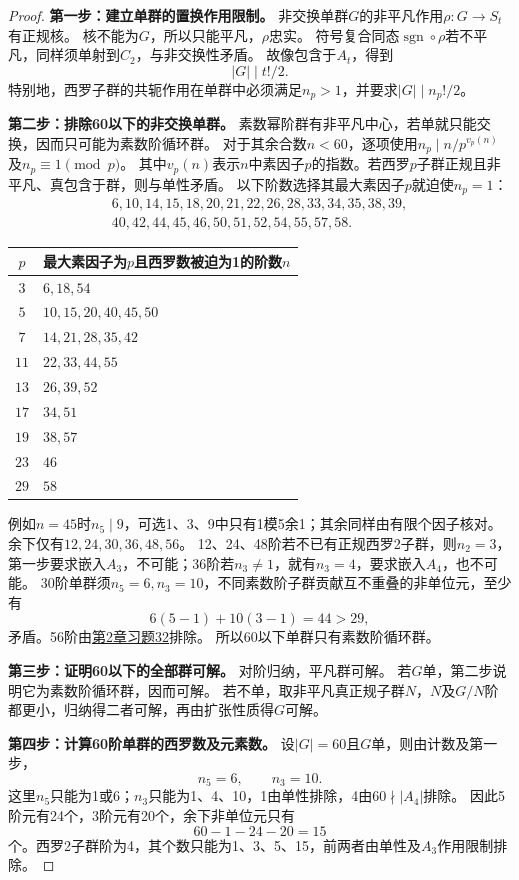 \documentclass[UTF8,a4paper,11pt,fontset=windows]{ctexart}
\newcommand{\exref}[2]{\hyperref[ex:#1:#2]{第#1章习题#2}}
\begin{document}
\begin{proof}
\textbf{第一步：建立单群的置换作用限制。}
非交换单群$G$的非平凡作用$\rho:G\to S_t$有正规核。
核不能为$G$，所以只能平凡，$\rho$忠实。
符号复合同态$\operatorname{sgn}\circ\rho$若不平凡，同样须单射到$C_2$，与非交换性矛盾。
故像包含于$A_t$，得到
\[
|G|\mid t!/2.
\]
特别地，西罗子群的共轭作用在单群中必须满足$n_p>1$，并要求$|G|\mid n_p!/2$。

\textbf{第二步：排除60以下的非交换单群。}
素数幂阶群有非平凡中心，若单就只能交换，因而只可能为素数阶循环群。
对于其余合数$n<60$，逐项使用$n_p\mid n/p^{v_p(n)}$及$n_p\equiv1\pmod p$。
其中$v_p(n)$表示$n$中素因子$p$的指数。若西罗$p$子群正规且非平凡、真包含于群，则与单性矛盾。
以下阶数选择其最大素因子$p$就迫使$n_p=1$：
\[
\begin{gathered}
6,10,14,15,18,20,21,22,26,28,33,34,35,38,39,\\
40,42,44,45,46,50,51,52,54,55,57,58.
\end{gathered}
\]

\begin{center}\begin{tabular}{c|p{11cm}}
$p$ & 最大素因子为$p$且西罗数被迫为1的阶数$n$\\\hline
$3$ & $6,18,54$\\
$5$ & $10,15,20,40,45,50$\\
$7$ & $14,21,28,35,42$\\
$11$ & $22,33,44,55$\\
$13$ & $26,39,52$\\
$17$ & $34,51$\\
$19$ & $38,57$\\
$23$ & $46$\\
$29$ & $58$\\
\end{tabular}\end{center}
例如$n=45$时$n_5\mid9$，可选1、3、9中只有1模5余1；其余同样由有限个因子核对。
余下仅有$12,24,30,36,48,56$。
12、24、48阶若不已有正规西罗2子群，则$n_2=3$，第一步要求嵌入$A_3$，不可能；36阶若$n_3\neq1$，就有$n_3=4$，要求嵌入$A_4$，也不可能。
30阶单群须$n_5=6,n_3=10$，不同素数阶子群贡献互不重叠的非单位元，至少有
\[
6(5-1)+10(3-1)=44>29,
\]
矛盾。56阶由\exref{2}{32}排除。
所以60以下单群只有素数阶循环群。

\textbf{第三步：证明60以下的全部群可解。}
对阶归纳，平凡群可解。
若$G$单，第二步说明它为素数阶循环群，因而可解。
若不单，取非平凡真正规子群$N$，$N$及$G/N$阶都更小，归纳得二者可解，再由扩张性质得$G$可解。

\textbf{第四步：计算60阶单群的西罗数及元素数。}
设$|G|=60$且$G$单，则由计数及第一步，
\[
n_5=6,\qquad n_3=10.
\]
这里$n_5$只能为1或6；$n_3$只能为1、4、10，1由单性排除，4由$60\nmid|A_4|$排除。
因此5阶元有24个，3阶元有20个，余下非单位元只有
\[
60-1-24-20=15
\]
个。西罗2子群阶为4，其个数只能为1、3、5、15，前两者由单性及$A_3$作用限制排除。


\end{proof}
\end{document}

